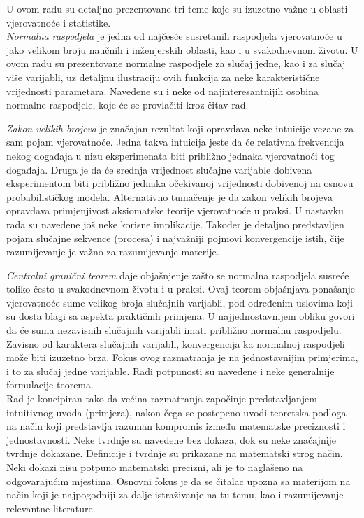 
\indent
U ovom radu su detaljno prezentovane tri teme koje su izuzetno važne u oblasti
vjerovatnoće i statistike.  \\

\textit{Normalna raspodjela} je jedna od najčesće susretanih raspodjela vjerovatnoće u
jako velikom broju naučnih i inženjerskih oblasti, kao i u svakodnevnom životu.
U ovom radu su prezentovane normalne raspodjele za slučaj jedne, kao i za slučaj
više varijabli, uz detaljnu ilustraciju ovih funkcija za neke karakteristične
vrijednosti parametara. Navedene su i neke od najinteresantnijih osobina
normalne raspodjele, koje će se provlačiti kroz čitav rad.

\textit{Zakon velikih brojeva} je značajan rezultat koji opravdava neke
intuicije vezane za sam pojam vjerovatnoće. Jedna takva intuicija jeste da će
relativna frekvencija nekog događaja u nizu eksperimenata biti približno jednaka
vjerovatnoći tog događaja. Druga je da će srednja vrijednost slučajne varijable
dobivena eksperimentom biti približno jednaka očekivanoj vrijednosti dobivenoj
na osnovu probabilističkog modela. Alternativno tumačenje je da zakon velikih
brojeva opravdava primjenjivost aksiomatske teorije vjerovatnoće u praksi. U
nastavku rada su navedene još neke korisne implikacije. Također je detaljno
predstavljen pojam slučajne sekvence (procesa) i najvažniji pojmovi
konvergencije istih, čije razumijevanje je važno za razumijevanje materije. 

\textit{Centralni granični teorem} daje objašnjenje zašto se normalna raspodjela
susreće toliko često u svakodnevnom životu i u praksi. Ovaj teorem objašnjava
ponašanje vjerovatnoće sume velikog broja slučajnih varijabli, pod određenim
uslovima koji su dosta blagi sa aspekta praktičnih primjena. U najjednostavnijem
obliku govori da će suma nezavisnih slučajnih varijabli imati približno normalnu
raspodjelu.  Zavisno od karaktera slučajnih varijabli, konvergencija ka
normalnoj raspodjeli može biti izuzetno brza. Fokus ovog razmatranja je na
jednostavnijim primjerima, i to za slučaj jedne varijable. Radi potpunosti su
navedene i neke generalnije formulacije teorema. \\

Rad je koncipiran tako da većina razmatranja započinje predstavljanjem
intuitivnog uvoda (primjera), nakon čega se postepeno uvodi teoretska podloga na
način koji predstavlja razuman kompromis između matematske preciznosti i
jednostavnosti.  Neke tvrdnje su navedene bez dokaza, dok su neke značajnije
tvrdnje dokazane.  Definicije i tvrdnje su prikazane na matematski strog način.
Neki dokazi nisu potpuno matematski precizni, ali je to naglašeno na
odgovarajućim mjestima.  Osnovni fokus je da se čitalac upozna sa materijom na
način koji je najpogodniji za dalje istraživanje na tu temu, kao i razumijevanje
relevantne literature. 

